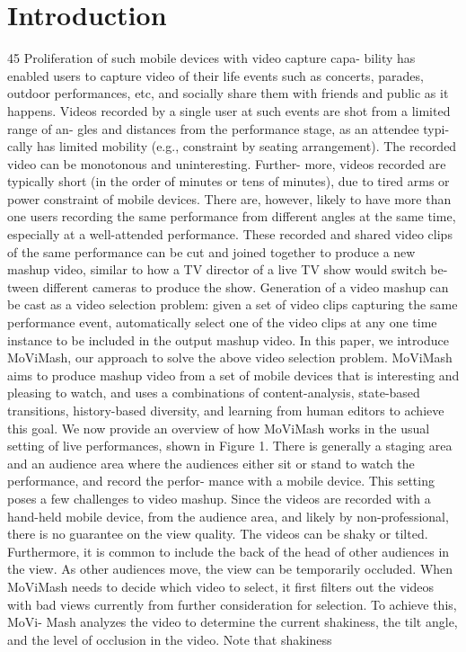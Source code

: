 \documentclass{sig-alternate}
\begin{document}
\section{Introduction}
45 %
Proliferation of such mobile devices with video capture capa-
bility has enabled users to capture video of their life events such
as concerts, parades, outdoor performances, etc, and socially share
them with friends and public as it happens. Videos recorded by
a single user at such events are shot from a limited range of an-
gles and distances from the performance stage, as an attendee typi-
cally has limited mobility (e.g., constraint by seating arrangement).
The recorded video can be monotonous and uninteresting. Further-
more, videos recorded are typically short (in the order of minutes
or tens of minutes), due to tired arms or power constraint of mobile
devices. There are, however, likely to have more than one users
recording the same performance from different angles at the same
time, especially at a well-attended performance.
These recorded and shared video clips of the same performance
can be cut and joined together to produce a new mashup video,
similar to how a TV director of a live TV show would switch be-
tween different cameras to produce the show. Generation of a video
mashup can be cast as a video selection problem: given a set of
video clips capturing the same performance event, automatically
select one of the video clips at any one time instance to be included
in the output mashup video.
In this paper, we introduce MoViMash, our approach to solve
the above video selection problem. MoViMash aims to produce
mashup video from a set of mobile devices that is interesting and
pleasing to watch, and uses a combinations of content-analysis,
state-based transitions, history-based diversity, and learning from
human editors to achieve this goal.
We now provide an overview of how MoViMash works in the
usual setting of live performances, shown in Figure 1. There is
generally a staging area and an audience area where the audiences
either sit or stand to watch the performance, and record the perfor-
mance with a mobile device. This setting poses a few challenges to
video mashup.
Since the videos are recorded with a hand-held mobile device,
from the audience area, and likely by non-professional, there is no
guarantee on the view quality. The videos can be shaky or tilted.
Furthermore, it is common to include the back of the head of other
audiences in the view. As other audiences move, the view can be
temporarily occluded. When MoViMash needs to decide which
video to select, it first filters out the videos with bad views currently
from further consideration for selection. To achieve this, MoVi-
Mash analyzes the video to determine the current shakiness, the tilt
angle, and the level of occlusion in the video. Note that shakiness
\end{document}
